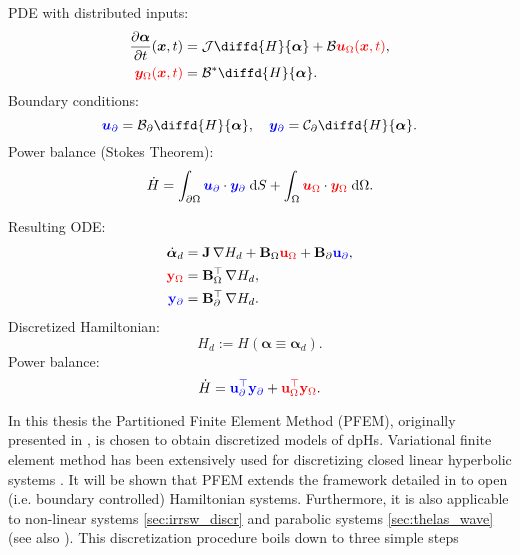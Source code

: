 \begin{tcbraster}[raster columns=2, raster equal height]
	\begin{tcolorbox}[width=0.4\textwidth, nobeforeafter, colframe=theme,title=Infinite-dimensional pH system]%
		PDE with distributed inputs:
		\begin{align*}
		\diffp{\bm{\alpha}}{t}(\bm{x}, t) &= \mathcal{J} {\displaystyle \diffd{H}{\bm{\alpha}}}+ \mathcal{B} \textcolor{red}{\bm{u}_\Omega(\bm{x}, t)}, \\
		\textcolor{red}{\bm{y}_\Omega(\bm{x}, t)} &= \mathcal{B}^* {\displaystyle \diffd{H}{\bm{\alpha}}}.
		\end{align*}
		Boundary conditions: 
		\[\textcolor{blue}{\bm{u}_\partial} = \mathcal{B}_\partial{\displaystyle \diffd{H}{\bm{\alpha}}}, \quad \textcolor{blue}{\bm{y}_\partial} = \mathcal{C}_\partial {\displaystyle \diffd{H}{\bm{\alpha}}}. \]
		Power balance (Stokes Theorem): 
		\[ \dot{H} = \displaystyle \int_{\partial \Omega} \textcolor{blue}{\bm{u}_\partial} \cdot \textcolor{blue}{\bm{y}_\partial} \d{S} +  \int_{\Omega} \textcolor{red}{\bm{u}_\Omega} \cdot \textcolor{red}{\bm{y}_\Omega} \d{\Omega}.
		\]
	\end{tcolorbox} 
	\begin{tcolorbox}[width=0.4\textwidth, nobeforeafter,  colframe=theme,title=Structure-preserving discretization]%
		Resulting ODE:
		\begin{align*}
		\dot{\bm{\alpha}}_d &= \mathbf{J} \, {\nabla {H}_d} + \mathbf{B}_\Omega \textcolor{red}{\mathbf{u}_\Omega} + \mathbf{B}_\partial \textcolor{blue}{\mathbf{u}_\partial}, \\
		\textcolor{red}{\mathbf{y}_\Omega} &= \mathbf{B}_\Omega^\top \, {\nabla {H}_d}, \\
		\textcolor{blue}{\mathbf{y}_\partial} &= \mathbf{B}_\partial^\top \,{\nabla {H}_d}.
		\end{align*}
		Discretized Hamiltonian:
		\[
		H_d := H(\bm{\alpha} \equiv \bm{\alpha}_d).
		\]
		Power balance: 
		\[ \dot{H} = \textcolor{blue}{\mathbf{u}_\partial^\top \mathbf{y}_\partial} +  \textcolor{red}{\mathbf{u}_\Omega^\top \mathbf{y}_\Omega}.
		\]
	\end{tcolorbox}
\end{tcbraster}
\vspace{.5cm}
In this thesis the Partitioned Finite Element Method (PFEM), originally presented in \cite{cardoso2018pfem,cardoso2019partitioned}, is chosen to obtain discretized models of dpHs. Variational finite element method has been extensively used for discretizing closed linear hyperbolic systems \cite{joly2003variational}. It will be shown that PFEM extends the framework detailed in \cite{joly2003variational} to open (i.e. boundary controlled) Hamiltonian systems. Furthermore, it  is also applicable to non-linear systems \ref{sec:irrsw_discr} and parabolic systems \ref{sec:thelas_wave} (see also \cite{serhani2019modeling,serhani2019discretization}).  This discretization procedure boils down to three simple steps

